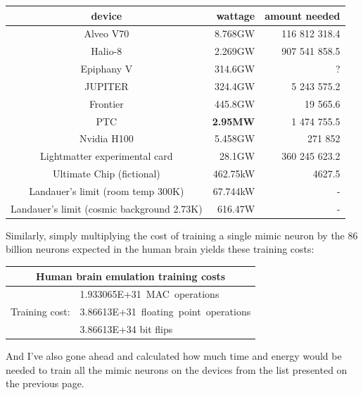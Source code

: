 \documentclass[a4paper]{article}
\begin{document}
	\medskip
	
	
	\begin{center}
		\begin{tabular}{c | r | r}
			device & wattage & amount needed \\ \hline
			Alveo V70 & 8.768GW & 116 812 318.4 \\ \hline%
			Halio-8 & 2.269GW & 907 541 858.5 \\ \hline%
			Epiphany V & 314.6GW & ? \\ \hline%
			JUPITER & 324.4GW & 5 243 575.2 \\ \hline%
			Frontier & 445.8GW & 19 565.6 \\ \hline%
			PTC & \textbf{2.95MW} & 1 474 755.5 \\ \hline%
			Nvidia H100 & 5.458GW & 271 852 \\ \hline
			Lightmatter experimental card & 28.1GW & 360 245 623.2 \\ \hline
			Ultimate Chip (fictional) & 462.75kW & 4627.5 \\ \hline%
			Landauer's limit (room temp 300K) & 67.744kW & - \\ \hline%
			Landauer's limit (cosmic background 2.73K) & 616.47W & -%
		\end{tabular}
	\end{center}
	
	\pagebreak
	
	Similarly, simply multiplying the cost of training a single mimic neuron by the 86 billion neurons expected in the human brain yields these training costs:
	
	\begin{center}
		\begin{tabular}{| c | l |}
			\hline
			\multicolumn{2}{|c|}{Human brain emulation training costs} \\\hline
			& 1.933065E+31~MAC~operations \\
			Training cost: & 3.86613E+31~floating~point~operations \\
			& 3.86613E+34 bit flips \\\hline
		\end{tabular}
	\end{center}
	
	And I've also gone ahead and calculated how much time and energy would be needed to train all the mimic neurons on the devices from the list presented on the previous page.
	
\end{document}
